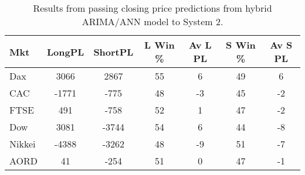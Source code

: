 \begin{table}[ht]
\centering
\caption[Results from passing closing price predictions from hybrid ARIMA/ANN model to System 2]{Results from passing closing price predictions from hybrid ARIMA/ANN model to System 2.} 
\label{tab:chp_ts:arima_ann_sys2}
\begin{tabular}{lcccccc}
  \toprule Mkt & LongPL & ShortPL & L Win \% & Av L PL & S Win \% & Av S PL \\ 
  \midrule Dax & 3066 & 2867 & 55 & 6 & 49 & 6 \\ 
  CAC & -1771 & -775 & 48 & -3 & 45 & -2 \\ 
  FTSE & 491 & -758 & 52 & 1 & 47 & -2 \\ 
  Dow & 3081 & -3744 & 54 & 6 & 44 & -8 \\ 
  Nikkei & -4388 & -3262 & 48 & -9 & 51 & -7 \\ 
  AORD & 41 & -254 & 51 & 0 & 47 & -1 \\ 
   \bottomrule \end{tabular}
\end{table}
